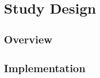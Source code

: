 
\section{Study Design}
\label{sec:study_design}


\subsection{Overview}

\subsection{Implementation}